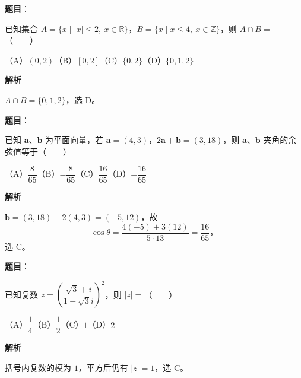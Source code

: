

\begin{answer}

\textbf{题目}：

已知集合 $A=\{x\mid |x|\leq2,\ x\in\mathbb R\}$，$B=\{x\mid x\leq4,\ x\in\mathbb Z\}$，则 $A\cap B=$\mbox{（　　）}

（A）$(0,2)$\quad（B）$[0,2]$\quad（C）$\{0,2\}$\quad（D）$\{0,1,2\}$

\textbf{解析}

$A\cap B=\{0,1,2\}$，选 D。


\end{answer}
\begin{answer}

\textbf{题目}：

已知 $\boldsymbol a\text{、}\boldsymbol b$ 为平面向量，若 $\boldsymbol a=(4,3)$，$2\boldsymbol a+\boldsymbol b=(3,18)$，则 $\boldsymbol a\text{、}\boldsymbol b$ 夹角的余弦值等于\mbox{（　　）}

（A）$\dfrac8{65}$\quad（B）$-\dfrac8{65}$\quad（C）$\dfrac{16}{65}$\quad（D）$-\dfrac{16}{65}$

\textbf{解析}

$\boldsymbol b=(3,18)-2(4,3)=(-5,12)$，故
\nopagebreak[4]
\[
\cos\theta=\frac{4(-5)+3(12)}{5\cdot13}=\frac{16}{65}\text{，}
\]
选 C。


\end{answer}
\begin{answer}

\textbf{题目}：

已知复数 $z=\left(\dfrac{\sqrt3+i}{1-\sqrt3i}\right)^2$，则 $|z|=$\mbox{（　　）}

（A）$\dfrac14$\quad（B）$\dfrac12$\quad（C）$1$\quad（D）$2$

\textbf{解析}

括号内复数的模为 $1$，平方后仍有 $|z|=1$，选 C。


\end{answer}
